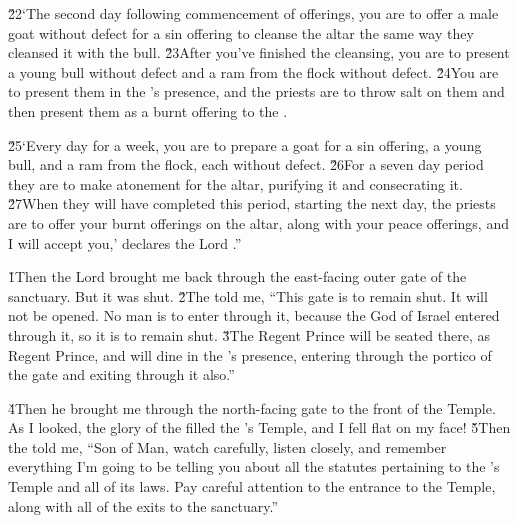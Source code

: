 \v{22}`The second day following commencement of offerings, you are to offer a male goat without defect for a sin offering to cleanse the altar the same way they cleansed it with the bull. \v{23}After you've finished the cleansing, you are to present a young bull without defect and a ram from the flock without defect. \v{24}You are to present them in the 's presence, and the priests are to throw salt on them and then present them as a burnt offering to the .

\v{25}`Every day for a week, you are to prepare a goat for a sin offering, a young bull, and a ram from the flock, each without defect. \v{26}For a seven day period they are to make atonement for the altar, purifying it and consecrating it. \v{27}When they will have completed this period, starting the next day, the priests are to offer your burnt offerings on the altar, along with your peace offerings, and I will accept you,' declares the Lord .''

\v{1}Then the Lord  brought me back through the east-facing outer gate of the sanctuary. But it was shut. \v{2}The  told me, ``This gate is to remain shut. It will not be opened. No man is to enter through it, because the  God of Israel entered through it, so it is to remain shut. \v{3}The Regent Prince will be seated there, as Regent Prince, and will dine in the 's presence, entering through the portico of the gate and exiting through it also.''

\v{4}Then he brought me through the north-facing gate to the front of the Temple. As I looked, the glory of the  filled the 's Temple, and I fell flat on my face! \v{5}Then the  told me, ``Son of Man, watch carefully, listen closely, and remember everything I'm going to be telling you about all the statutes pertaining to the 's Temple and all of its laws. Pay careful attention to the entrance to the Temple, along with all of the exits to the sanctuary.''

